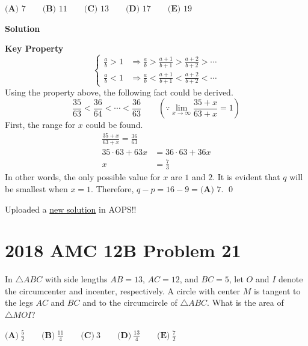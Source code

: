 \documentclass{article}
\newenvironment{solution}{\begin{trivlist}\item[]{\bf Solution}}{\qed \end{trivlist}}
\begin{document}
$\textbf{(A) } 7 \qquad \textbf{(B) } 11 \qquad \textbf{(C) } 13 \qquad \textbf{(D) } 17 \qquad \textbf{(E) } 19$

\begin{solution}

\textbf{Key Property}
\[
\begin{cases}
    \frac{a}{b} > 1 &\Rightarrow \frac{a}{b} > \frac{a + 1}{b + 1} > \frac{a + 2}{b + 2} > \cdots \\
    \frac{a}{b} < 1 &\Rightarrow \frac{a}{b} < \frac{a + 1}{b + 1} < \frac{a + 2}{b + 2} < \cdots
\end{cases}
\]
Using the property above, the following fact could be derived.
\[
\frac{35}{63} < \frac{36}{64} < \cdots < \frac{36}{63} \qquad \left( \because \lim_{x \rightarrow \infty} \frac{35 + x}{63 + x} = 1 \right)
\]
First, the range for $x$ could be found.
\begin{align*}
    \frac{35 + x}{63 + x} = \frac{36}{63} \\
    35 \cdot 63 + 63x &= 36 \cdot 63 + 36x \\
    x &= \frac{7}{3}
\end{align*}
In other words, the only possible value for $x$ are $1$ and $2$. It is evident that $q$ will be smallest when $x = 1$. Therefore, $q - p = 16 - 9 = \boxed{\textbf{(A) } 7}$.
\end{solution}
Uploaded a \href{https://artofproblemsolving.com/wiki/index.php/2018_AMC_12B_Problems/Problem_17#Solution_13}{new solution} in AOPS!! \\

\section*{2018 AMC 12B Problem 21}
In $\triangle{ABC}$ with side lengths $AB = 13$, $AC = 12$, and $BC = 5$, let $O$ and $I$ denote the circumcenter and incenter, respectively. A circle with center $M$ is tangent to the legs $AC$ and $BC$ and to the circumcircle of $\triangle{ABC}$. What is the area of $\triangle{MOI}$?

$\textbf{(A)}\ \frac52\qquad\textbf{(B)}\ \frac{11}{4}\qquad\textbf{(C)}\ 3\qquad\textbf{(D)}\ \frac{13}{4}\qquad\textbf{(E)}\ \frac72$
\end{document}
